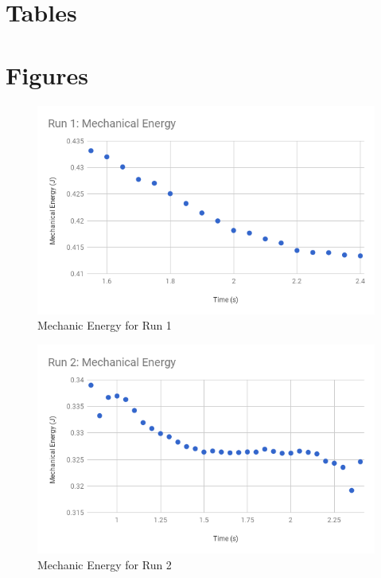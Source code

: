 \section{Tables}
\begin{table}[ht]
\end{table}
\FloatBarrier
\newpage
\section{Figures}
\begin{figure}[ht]
    \centering
    \includegraphics[scale=0.71]{image/07-mechanic/run-1-energy.png}
    \caption{Mechanic Energy for Run 1}
    \label{figure.07.run.1.e}
\end{figure}
\begin{figure}[ht]
    \centering
    \includegraphics[scale=0.71]{image/07-mechanic/run-2-energy.png}
    \caption{Mechanic Energy for Run 2}
    \label{figure.07.run.2.e}
\end{figure}

